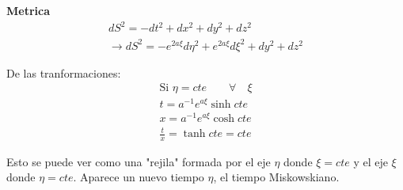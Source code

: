 \documentclass{article}
\begin{document}
\textbf{Metrica }
\begin{gather*}
  dS ^ {2 } = - dt ^ {2 } + dx ^ {2 } + dy ^ {2 } + dz ^ {2 } \\
  \rightarrow dS ^ {2 } = - e ^ {2a \xi }d\eta ^ {2 } + e ^ {2a \xi } d \xi^2 + dy^2 + dz^2 
\end{gather*}

De las tranformaciones: 
\begin{gather*}
  \text{Si }\eta = cte \qquad \forall \quad \xi \\
  t = a ^ {-1 } e ^ {a \xi } \sinh cte \\
  x = a ^ {-1 } e ^ {a \xi } \cosh cte \\
  \frac{t}{x} = \tanh{cte} = cte
\end{gather*}


Esto se puede ver como una "rejila" formada por el eje $ \eta  $ donde $ \xi = cte  $ y el eje $ \xi  $ donde $ \eta = cte  $. Aparece un nuevo tiempo $ \eta  $, el tiempo Miskowskiano.
\end{document}
